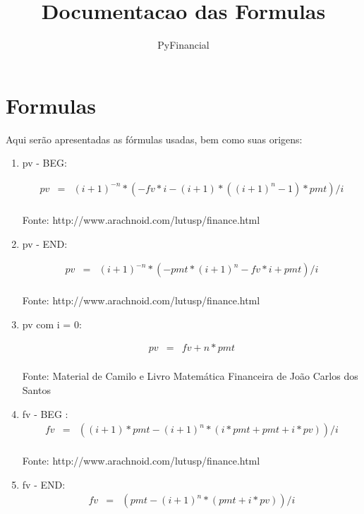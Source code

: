 \documentclass[a4paper,10pt]{article}
\title{Documentacao das Formulas}
\author{PyFinancial}
\begin{document}
\maketitle

\begin{abstract}

\end{abstract}

\section{Formulas}

Aqui serão apresentadas as fórmulas usadas, bem como suas origens: \\

\begin{enumerate}
 \item pv - BEG:

\begin{eqnarray*}
pv &=& (i+1)^{-n} * ( -fv*i - (i+1) * ( (i+1)^{n} -1)*pmt  ) / i\\
\end{eqnarray*}

Fonte: http://www.arachnoid.com/lutusp/finance.html

\item pv - END:

\begin{eqnarray*}
	pv &=& (i+1)^{-n} * ( -pmt*(i+1)^{n} - fv*i + pmt) / i \\
\end{eqnarray*}

 Fonte: http://www.arachnoid.com/lutusp/finance.html

\item pv com i = 0: 

\begin{eqnarray*}
  pv &=& fv + n * pmt  \\
\end{eqnarray*}

Fonte: Material de Camilo e Livro Matemática Financeira de João Carlos dos Santos

\item fv - BEG :
\begin{eqnarray*}
 fv &=& ( (i+1)*pmt - (i+1)^{n}*(i*pmt + pmt + i*pv) ) / i \\
\end{eqnarray*}

 Fonte: http://www.arachnoid.com/lutusp/finance.html

\item fv - END: 
\begin{eqnarray*}
fv &=& ( pmt - (i+1)^{n} * (pmt + i*pv) ) / i \\
\end{eqnarray*}


\end{enumerate}
\end{document}
